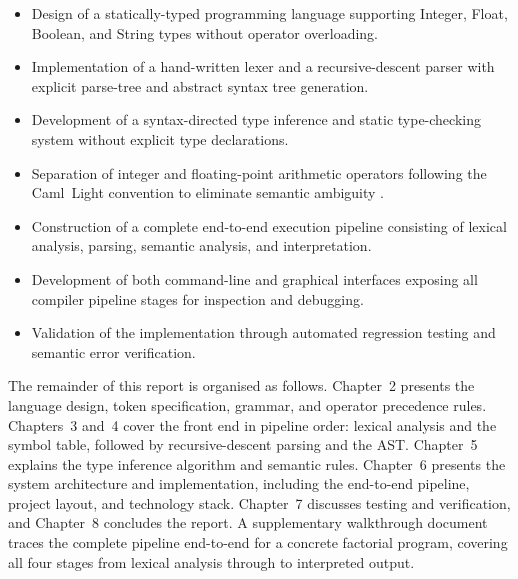 \begin{itemize}[leftmargin=1.5em, itemsep=2pt]
    \item Design of a statically-typed programming language supporting Integer,
    Float, Boolean, and String types without operator overloading.
    \item Implementation of a hand-written lexer and a recursive-descent parser
    with explicit parse-tree and abstract syntax tree generation.
    \item Development of a syntax-directed type inference and static
    type-checking system without explicit type declarations.
    \item Separation of integer and floating-point arithmetic operators
    following the Caml~Light convention to eliminate semantic ambiguity
    \citep{nystrom2021crafting}.
    \item Construction of a complete end-to-end execution pipeline consisting
    of lexical analysis, parsing, semantic analysis, and interpretation.
    \item Development of both command-line and graphical interfaces exposing
    all compiler pipeline stages for inspection and debugging.
    \item Validation of the implementation through automated regression
    testing and semantic error verification.
\end{itemize}

The remainder of this report is organised as follows. Chapter~2 presents the
language design, token specification, grammar, and operator precedence rules.
Chapters~3 and~4 cover the front end in pipeline order: lexical analysis and
the symbol table, followed by recursive-descent parsing and the AST.
Chapter~5 explains the type inference algorithm and semantic rules.
Chapter~6 presents the system architecture and implementation, including the
end-to-end pipeline, project layout, and technology stack. Chapter~7 discusses
testing and verification, and Chapter~8 concludes the report.
A supplementary walkthrough document traces the complete pipeline end-to-end
for a concrete factorial program, covering all four stages from lexical
analysis through to interpreted output.
